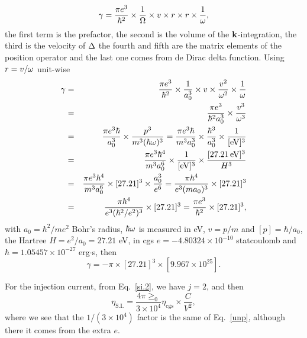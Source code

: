 \documentclass[12pt]{article}
\numberwithin{equation}{section}
\begin{document}
\begin{enumerate}
\begin{equation*}\label{unpnn}
\gamma=\frac{\pi e^3}{\hbar^2}\times\frac{1}{\Omega}\times v \times   
r\times r \times \frac{1}{\omega}
,
\end{equation*}   
the first term is the prefactor, the second is the volume of the 
$\mathbf{k}$-integration, the third is the velocity of $\Delta$ the fourth and 
fifth are the matrix elements of the position operator and the last 
one comes from de Dirac delta function. Using $r=v/\omega$ unit-wise 
\begin{eqnarray*}\label{un1}
\gamma
&=&
\frac{\pi e^3}{\hbar^2}\times\frac{1}{a_0^3}\times v \times
\frac{v^2}{\omega^2}
\times \frac{1}{\omega}
\nonumber\\
&=&
\frac{\pi e^3}{\hbar^2a_0^3}\times
\frac{v^3}{\omega^3}
\nonumber\\
&=&
\frac{\pi e^3\hbar}{a_0^3}\times
\frac{p^3}{m^3(\hbar\omega)^3}
=
\frac{\pi e^3\hbar}{m^3a_0^3}\times
\frac{\hbar^3}{a_0^3}
\times
\frac{1}{[\mathrm{eV}]^3}
\nonumber\\
&=&
\frac{\pi e^3\hbar^4}{m^3a_0^6}\times
\frac{1}{[\mathrm{eV}]^3}
\times
\frac{[27.21\,\mathrm{eV}]^3}{H^3}
\nonumber\\
&=&
\frac{\pi e^3\hbar^4}{m^3a_0^6}\times
[27.21]^3
\times
\frac{a_0^3}{e^6}
=
\frac{\pi \hbar^4}{e^3(ma_0)^3}\times
[27.21]^3
\nonumber\\
&=&
\frac{\pi \hbar^4}{e^3(\hbar^2/e^2)^3}\times
[27.21]^3
=
\frac{\pi e^3}{\hbar^2}\times
[27.21]^3
,
\end{eqnarray*}
with $a_0=\hbar^2/me^2$ Bohr's radius, $\hbar\omega$ is measured in eV, $v=p/m$ and 
$[p]=\hbar/a_0$, the Hartree $H=e^2/a_0=27.21$ eV, in cgs 
$e=-4.80324\times 10^{-10}$ statcoulomb and $\hbar=1.05457\times 
10^{-27}$ erg$\cdot$s, then 
\begin{equation*}\label{gam2}
\gamma=-
\pi
\times
[27.21]^3
\times
[9.967\times 10^{25}]
.
\end{equation*}

For the injection current, from Eq.~\eqref{si.2},
we have $j=2$, and then 
\begin{equation}\label{1si2}
\eta_{\mathrm{S.I.}}=\frac{4\pi\ge_0}{3 \times  10 ^4}\eta_{\mathrm{cgs}} \times \frac{C}{V^2}
,
\end{equation} 
where we see that the $1/(3 \times  10 ^4)$ factor is the same of 
Eq.~\eqref{unp}, although there it comes from the extra $e$. 


\end{enumerate}
\end{document}
